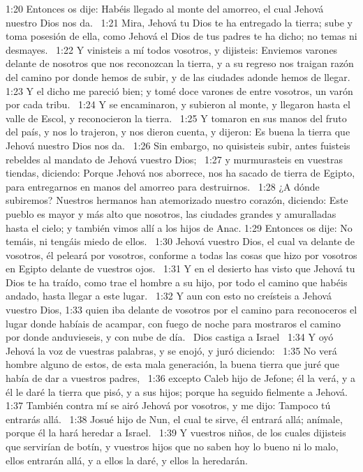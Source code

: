 1:20 Entonces os dije: Habéis llegado al monte del amorreo, el cual Jehová nuestro Dios nos da.  
1:21 Mira, Jehová tu Dios te ha entregado la tierra; sube y toma posesión de ella, como Jehová el Dios de tus padres te ha dicho; no temas ni desmayes.  
1:22 Y vinisteis a mí todos vosotros, y dijisteis: Enviemos varones delante de nosotros que nos reconozcan la tierra, y a su regreso nos traigan razón del camino por donde hemos de subir, y de las ciudades adonde hemos de llegar.  
1:23 Y el dicho me pareció bien; y tomé doce varones de entre vosotros, un varón por cada tribu.  
1:24 Y se encaminaron, y subieron al monte, y llegaron hasta el valle de Escol, y reconocieron la tierra.  
1:25 Y tomaron en sus manos del fruto del país, y nos lo trajeron, y nos dieron cuenta, y dijeron: Es buena la tierra que Jehová nuestro Dios nos da.  
1:26 Sin embargo, no quisisteis subir, antes fuisteis rebeldes al mandato de Jehová vuestro Dios;  
1:27 y murmurasteis en vuestras tiendas, diciendo: Porque Jehová nos aborrece, nos ha sacado de tierra de Egipto, para entregarnos en manos del amorreo para destruirnos.  
1:28 ¿A dónde subiremos? Nuestros hermanos han atemorizado nuestro corazón, diciendo: Este pueblo es mayor y más alto que nosotros, las ciudades grandes y amuralladas hasta el cielo; y también vimos allí a los hijos de Anac. 
1:29 Entonces os dije: No temáis, ni tengáis miedo de ellos.  
1:30 Jehová vuestro Dios, el cual va delante de vosotros, él peleará por vosotros, conforme a todas las cosas que hizo por vosotros en Egipto delante de vuestros ojos.  
1:31 Y en el desierto has visto que Jehová tu Dios te ha traído, como trae el hombre a su hijo, por todo el camino que habéis andado, hasta llegar a este lugar.  
1:32 Y aun con esto no creísteis a Jehová vuestro Dios, 
1:33 quien iba delante de vosotros por el camino para reconoceros el lugar donde habíais de acampar, con fuego de noche para mostraros el camino por donde anduvieseis, y con nube de día.  
Dios castiga a Israel   
1:34 Y oyó Jehová la voz de vuestras palabras, y se enojó, y juró diciendo:  
1:35 No verá hombre alguno de estos, de esta mala generación, la buena tierra que juré que había de dar a vuestros padres,  
1:36 excepto Caleb hijo de Jefone; él la verá, y a él le daré la tierra que pisó, y a sus hijos; porque ha seguido fielmente a Jehová.  
1:37 También contra mí se airó Jehová por vosotros, y me dijo: Tampoco tú entrarás allá.  
1:38 Josué hijo de Nun, el cual te sirve, él entrará allá; anímale, porque él la hará heredar a Israel.  
1:39 Y vuestros niños, de los cuales dijisteis que servirían de botín, y vuestros hijos que no saben hoy lo bueno ni lo malo, ellos entrarán allá, y a ellos la daré, y ellos la heredarán.  
